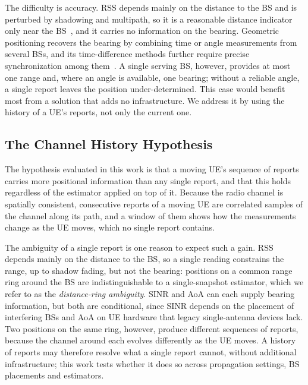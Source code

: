 The difficulty is accuracy. RSS depends mainly on the distance to the BS and is perturbed by shadowing and multipath, so it is a reasonable distance indicator only near the BS~\cite{italiano2025tutorial}, and it carries no information on the bearing. Geometric positioning recovers the bearing by combining time or angle measurements from several BSs, and its time-difference methods further require precise synchronization among them~\cite{italiano2025tutorial}. A single serving BS, however, provides at most one range and, where an angle is available, one bearing; without a reliable angle, a single report leaves the position under-determined. This case would benefit most from a solution that adds no infrastructure. We address it by using the history of a UE's reports, not only the current one.

\subsection{The Channel History Hypothesis}
\label{subsec:ambiguity-hypothesis}

The hypothesis evaluated in this work is that a moving UE's sequence of reports carries more positional information than any single report, and that this holds regardless of the estimator applied on top of it. Because the radio channel is spatially consistent, consecutive reports of a moving UE are correlated samples of the channel along its path, and a window of them shows how the measurements change as the UE moves, which no single report contains.

The ambiguity of a single report is one reason to expect such a gain. RSS depends mainly on the distance to the BS, so a single reading constrains the range, up to shadow fading, but not the bearing: positions on a common range ring around the BS are indistinguishable to a single-snapshot estimator, which we refer to as the \emph{distance-ring ambiguity}. SINR and AoA can each supply bearing information, but both are conditional, since SINR depends on the placement of interfering BSs and AoA on UE hardware that legacy single-antenna devices lack. Two positions on the same ring, however, produce different sequences of reports, because the channel around each evolves differently as the UE moves. A history of reports may therefore resolve what a single report cannot, without additional infrastructure; this work tests whether it does so across propagation settings, BS placements and estimators.


